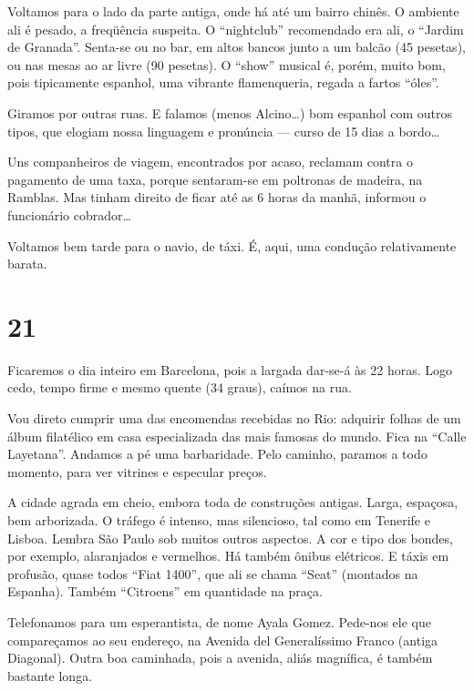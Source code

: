 Voltamos para o lado da parte antiga, onde há até um bairro chinês. O ambiente ali é pesado, a freqüência suspeita. O ``nightclub'' recomendado era ali, o ``Jardim de Granada''. Senta-se ou no bar, em altos bancos junto a um balcão (45 pesetas), ou nas mesas ao ar livre (90 pesetas). O ``show'' musical é, porém, muito bom, pois tipicamente espanhol, uma vibrante flamenqueria, regada a fartos ``óles''.

Giramos por outras ruas. E falamos (menos Alcino\ldots) bom espanhol com outros tipos, que elogiam nossa linguagem e pronúncia --- curso de 15 dias a bordo\ldots

Uns companheiros de viagem, encontrados por acaso, reclamam contra o pagamento de uma taxa, porque sentaram-se em poltronas de madeira, na Ramblas. Mas tinham direito de ficar até as 6 horas da manhã, informou o funcionário cobrador\ldots

Voltamos bem tarde para o navio, de táxi. É, aqui, uma condução relativamente barata.

\section*{21 \adfflatleafright {}}

Ficaremos o dia inteiro em Barcelona, pois a largada dar-se-á às 22 horas. Logo cedo, tempo firme e mesmo quente (34 graus), caímos na rua.

Vou direto cumprir uma das encomendas recebidas no Rio: adquirir folhas de um álbum filatélico em casa especializada das mais famosas do mundo. Fica na ``Calle Layetana''. Andamos a pé uma barbaridade. Pelo caminho, paramos a todo momento, para ver vitrines e especular preços.

A cidade agrada em cheio, embora toda de construções antigas. Larga, espaçosa, bem arborizada. O tráfego é intenso, mas silencioso, tal como em Tenerife e Lisboa. Lembra São Paulo sob muitos outros aspectos. A cor e tipo dos bondes, por exemplo, alaranjados e vermelhos. Há também ônibus elétricos. E táxis em profusão, quase todos ``Fiat 1400'', que ali se chama ``Seat'' (montados na Espanha). Também ``Citroens'' em quantidade na praça.

Telefonamos para um esperantista, de nome Ayala Gomez. Pede-nos ele que compareçamos ao seu endereço, na Avenida del Generalíssimo Franco (antiga Diagonal). Outra boa caminhada, pois a avenida, aliás magnífica, é também bastante longa.

